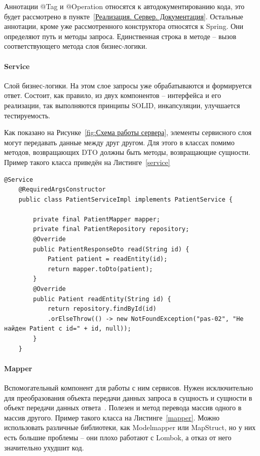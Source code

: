 \documentclass[a4paper,article]{article}
\begin{document}
\begin{sloppypar}
    Аннотации @Tag и @Operation относятся к автодокументированию кода, это будет рассмотрено в пункте~\ref{Реализация. Сервер. Документация}. Остальные аннотации, кроме уже рассмотренного конструктора относятся к Spring. Они определяют путь и методы запроса. Единственная строка в методе -- вызов соответствующего метода слоя бизнес-логики.

    \paragraph{Service}\label{Реализация. Сервер. Service}

    Слой бизнес-логики. На этом слое запросы уже обрабатываются и формируется ответ. Состоит, как правило, из двух компонентов -- интерфейса и его реализации, так выполняются принципы SOLID, инкапсуляции, улучшается тестируемость.

    Как показано на Рисунке~\ref{fig:Схема работы сервера}, элементы сервисного слоя могут передавать данные между друг другом. Для этого в классах помимо методов, возвращающих DTO должны быть методы, возвращающие сущности. Пример такого класса приведён на Листинге~\ref{service}

   \begin{lstlisting}[label=service,caption=Пример класса слоя бизнес-логики]
    @Service
    @RequiredArgsConstructor
    public class PatientServiceImpl implements PatientService {

        private final PatientMapper mapper;
        private final PatientRepository repository;
        @Override
        public PatientResponseDto read(String id) {
            Patient patient = readEntity(id);
            return mapper.toDto(patient);
        }
        @Override
        public Patient readEntity(String id) {
            return repository.findById(id)
            .orElseThrow(() -> new NotFoundException("pas-02", "Не найден Patient с id=" + id, null));
        }
    }
    \end{lstlisting}

    \paragraph{Mapper}\label{Реализация. Сервер. Mapper}

    Вспомогательный компонент для работы с ним сервисов. Нужен исключительно для преобразования объекта передачи данных запроса в сущность и сущности в объект передачи данных ответа~\cite{baeldungbook, springguide, cleanarch}. Полезен и метод перевода массив одного в массив другого. Пример такого класса на Листинге~\ref{mapper}. Можно использовать различные библиотеки, как Modelmapper или MapStruct, но у них есть большие проблемы -- они плохо работают с Lombok, а отказ от него значительно ухудшит код.


\end{sloppypar}
\end{document}
